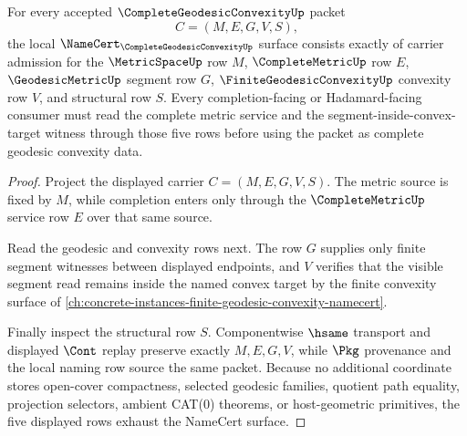 \begin{theorem}
\label{thm:complete-geodesic-convexity-carrier}
For every accepted $\CompleteGeodesicConvexityUp$ packet
$$
C=(M,E,G,V,S),
$$
the local $\NameCert_{\CompleteGeodesicConvexityUp}$ surface consists exactly of carrier admission for the $\MetricSpaceUp$ row $M$, $\CompleteMetricUp$ row $E$, $\GeodesicMetricUp$ segment row $G$, $\FiniteGeodesicConvexityUp$ convexity row $V$, and structural row $S$. Every completion-facing or Hadamard-facing consumer must read the complete metric service and the segment-inside-convex-target witness through those five rows before using the packet as complete geodesic convexity data.
\end{theorem}
\begin{proof}
Project the displayed carrier $C=(M,E,G,V,S)$. The metric source is fixed by $M$, while completion enters only through the $\CompleteMetricUp$ service row $E$ over that same source.

Read the geodesic and convexity rows next. The row $G$ supplies only finite segment witnesses between displayed endpoints, and $V$ verifies that the visible segment read remains inside the named convex target by the finite convexity surface of \autoref{ch:concrete-instances-finite-geodesic-convexity-namecert}.

Finally inspect the structural row $S$. Componentwise $\hsame$ transport and displayed $\Cont$ replay preserve exactly $M,E,G,V$, while $\Pkg$ provenance and the local naming row source the same packet. Because no additional coordinate stores open-cover compactness, selected geodesic families, quotient path equality, projection selectors, ambient CAT(0) theorems, or host-geometric primitives, the five displayed rows exhaust the NameCert surface.
\end{proof}



